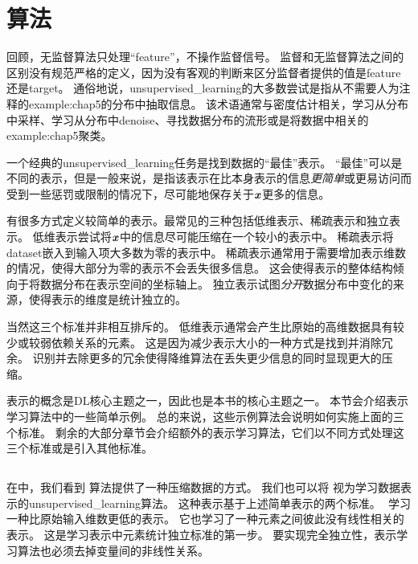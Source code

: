 \section{算法}
\label{sec:unsupervised_learning_algorithms}
回顾，无监督算法只处理``\gls{feature}''，不操作监督信号。
监督和无监督算法之间的区别没有规范严格的定义，因为没有客观的判断来区分监督者提供的值是\gls{feature}还是\gls{target}。
通俗地说，\gls{unsupervised_learning}的大多数尝试是指从不需要人为注释的\gls{example:chap5}的分布中抽取信息。
该术语通常与密度估计相关，学习从分布中采样、学习从分布中\gls{denoise}、寻找数据分布的流形或是将数据中相关的\gls{example:chap5}聚类。

一个经典的\gls{unsupervised_learning}任务是找到数据的``最佳''表示。
``最佳''可以是不同的表示，但是一般来说，是指该表示在比本身表示的信息\emph{更简单}或更易访问而受到一些惩罚或限制的情况下，尽可能地保存关于$\boldsymbol{\mathit{x}}$更多的信息。 


有很多方式定义较简单的表示。最常见的三种包括低维表示、稀疏表示和独立表示。
低维表示尝试将$\boldsymbol{\mathit{x}}$中的信息尽可能压缩在一个较小的表示中。
稀疏表示将\gls{dataset}嵌入到输入项大多数为零的表示中\citep{Barlow89,Olshausen+Field-1996,Hinton+Ghahramani-97}。
稀疏表示通常用于需要增加表示维数的情况，使得大部分为零的表示不会丢失很多信息。
这会使得表示的整体结构倾向于将数据分布在表示空间的坐标轴上。
独立表示试图\emph{分开}数据分布中变化的来源，使得表示的维度是统计独立的。

当然这三个标准并非相互排斥的。
低维表示通常会产生比原始的高维数据具有较少或较弱依赖关系的元素。
这是因为减少表示大小的一种方式是找到并消除冗余。
识别并去除更多的冗余使得降维算法在丢失更少信息的同时显现更大的压缩。

表示的概念是\gls{DL}核心主题之一，因此也是本书的核心主题之一。
本节会介绍表示学习算法中的一些简单示例。
总的来说，这些示例算法会说明如何实施上面的三个标准。
剩余的大部分章节会介绍额外的表示学习算法，它们以不同方式处理这三个标准或是引入其他标准。

\subsection{}
\label{sec:principal_components_analysis_chap5}
在中，我们看到\,\,算法提供了一种压缩数据的方式。
我们也可以将\,\,视为学习数据表示的\gls{unsupervised_learning}算法。
这种表示基于上述简单表示的两个标准。
\,\,学习一种比原始输入维数更低的表示。
它也学习了一种元素之间彼此没有线性相关的表示。
这是学习表示中元素统计独立标准的第一步。
要实现完全独立性，表示学习算法也必须去掉变量间的非线性关系。

